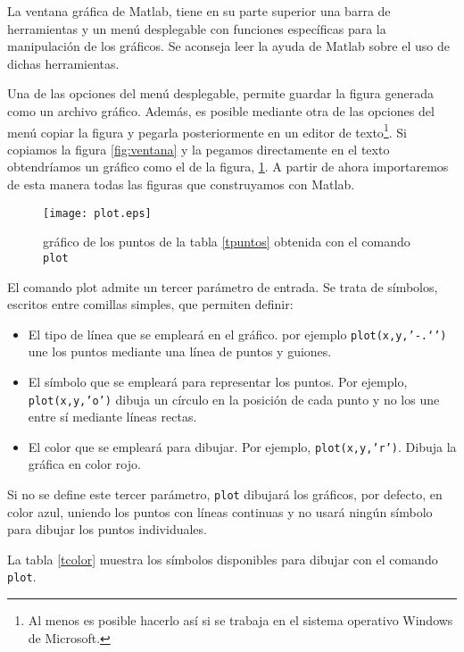 La ventana gráfica de Matlab, tiene en su parte superior una barra de herramientas y un menú desplegable con funciones específicas para la manipulación de los gráficos. Se aconseja leer la ayuda de Matlab sobre el uso de dichas herramientas.

Una de las opciones del menú desplegable, permite guardar la figura generada como un archivo gráfico. Además, es posible mediante otra de las opciones del menú copiar la figura y pegarla posteriormente en un editor de texto\footnote{Al menos es posible hacerlo así si se trabaja en el sistema operativo Windows de Microsoft.}. Si copiamos la figura \ref{fig:ventana} y la pegamos directamente en el texto obtendríamos un gráfico como el de la figura, \ref{fig:plot}. A partir de ahora importaremos de esta manera todas las figuras que construyamos con Matlab.

\begin{figure}[h]
\centering
\texttt{[image: plot.eps]}
\caption{gráfico de los puntos de la tabla \ref{tpuntos} obtenida con el comando \texttt{plot}}
\label{fig:plot}
\end{figure}
El comando plot admite un tercer parámetro de entrada. Se trata de símbolos, escritos entre comillas simples, que permiten definir: 
\begin{itemize}
\item El tipo de línea que se empleará en el gráfico. por ejemplo \texttt{plot(x,y,'-.`')} une los puntos mediante una línea de puntos y guiones.
\item El símbolo que se empleará para representar los puntos. Por ejemplo, \texttt{plot(x,y,'o')} dibuja un círculo en la posición de cada punto y no los une entre sí mediante líneas rectas.
\item El color que se empleará para dibujar. Por ejemplo, \texttt{plot(x,y,'r')}. Dibuja la gráfica en color rojo.
\end{itemize}

Si no se define este tercer parámetro, \texttt{plot} dibujará los gráficos, por defecto, en color azul, uniendo los puntos con líneas continuas y no usará ningún símbolo para dibujar los puntos individuales.
 
La tabla \ref{tcolor} muestra los símbolos disponibles para dibujar con el comando \texttt{plot}.

